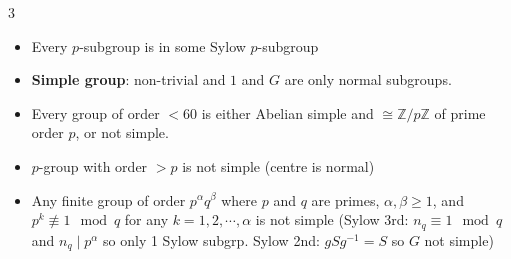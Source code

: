 \documentclass[10pt]{article}
\newcommand{\Z}{\mathbb{Z}} %
\begin{document}
\begin{multicols*}{3}
\begin{itemize}
\begin{enumerate}
            \end{enumerate}
            \item Every $p$-subgroup is in some Sylow $p$-subgroup
            \item \textbf{Simple group}: non-trivial and $1$ and $G$ are only normal subgroups.
            \item Every group of order $< 60$ is either Abelian simple and $\cong \Z \slash p\Z$ of prime order $p$, or not simple.
            \item $p$-group with order $> p$ is not simple (centre is normal)
            \item Any finite group of order $p^{\alpha}q^{\beta}$ where $p$ and $q$ are primes, $\alpha, \beta \geq 1$, and $p^k \not\equiv 1 \mod q$ for any $k = 1, 2, \cdots, \alpha$ is not simple (Sylow 3rd: $n_q \equiv 1 \mod q$ and $n_q \mid p^{\alpha}$ so only 1 Sylow subgrp. Sylow 2nd: $gSg^{-1} = S$ so $G$ not simple)
        \end{itemize}
    \end{multicols*}
\end{document}
